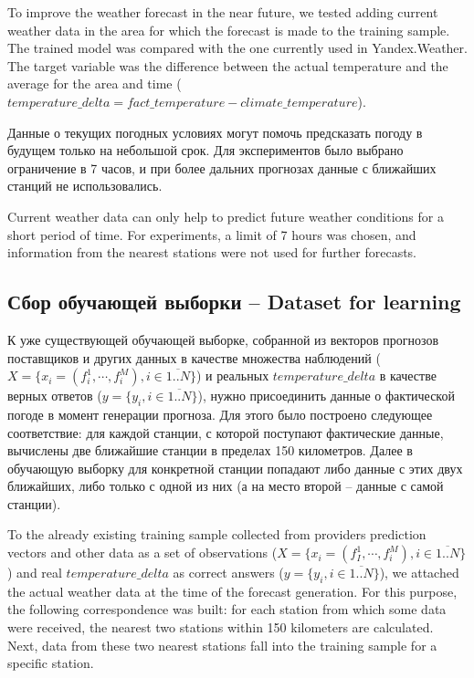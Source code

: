 \documentclass[14pt]{matmex-diploma}
\begin{document}
To improve the weather forecast in the near future, we tested adding current weather data in the area for which the forecast is made to the training sample. The trained model was compared with the one currently used in Yandex.Weather. The target variable was the difference between the actual temperature and the average for the area and time ($temperature\_delta = fact\_temperature - climate\_temperature$).

Данные о текущих погодных условиях могут помочь предсказать погоду в будущем только на небольшой срок. Для экспериментов было выбрано ограничение в 7 часов, и при более дальних прогнозах данные с ближайших станций не использовались.

Current weather data can only help to predict future weather conditions for a short period of time. For experiments, a limit of 7 hours was chosen, and information from the nearest stations were not used for further forecasts.

\subsection{Сбор обучающей выборки -- Dataset for learning}
К уже существующей обучающей выборке, собранной из векторов прогнозов поставщиков и других данных в качестве множества наблюдений ($X = \{x_i = (f^1_{i}, \cdots, f^M_i), i \in \overline{1..N}\}$) и реальных $temperature\_delta$ в качестве верных ответов ($y = \{y_i, i \in \overline{1..N}\}$), нужно присоединить данные о фактической погоде в момент генерации прогноза. Для этого было построено следующее соответствие: для каждой станции, с которой поступают фактические данные, вычислены две ближайшие станции в пределах 150 километров. Далее в обучающую выборку для конкретной станции попадают либо данные с этих двух ближайших, либо только с одной из них (а на место второй -- данные с самой станции). %

To the already existing training sample collected from providers prediction vectors and other data as a set of observations ($X = \{x_i = (f^1_{I}, \cdots, f^M_i), i \in \overline{1..N}\}$) and real $temperature\_delta$ as correct answers ($y = \{y_i, i \in \overline{1..N}\}$), we attached the actual weather data at the time of the forecast generation. For this purpose, the following correspondence was built: for each station from which some data were received, the nearest two stations within 150 kilometers are calculated. Next, data from these two nearest stations fall into the training sample for a specific station.
\end{document}

